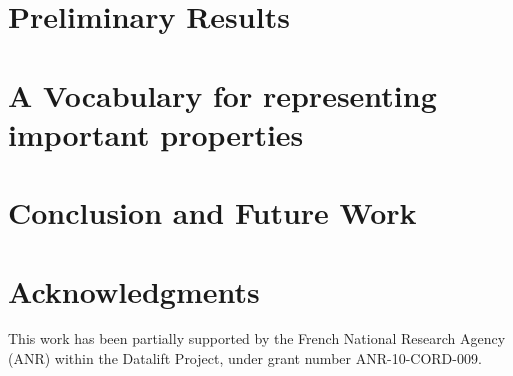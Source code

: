 \documentclass[runningheads,a4paper]{llncs}
\begin{document}
\section{Preliminary Results}
\label{sec:preli}


\section{ A Vocabulary for representing important properties }
\label{sec:vocab}



\section{Conclusion and Future Work}
\label{sec:conclusion}


\section*{Acknowledgments} \label{sec:acknowledgments}
This work has been partially supported by the French National Research Agency (ANR) within the Datalift Project, under grant number ANR-10-CORD-009. 


\nocite{*}

\end{document}
